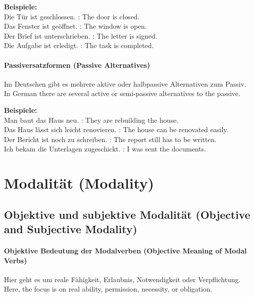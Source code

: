 \documentclass[a4paper]{article}
\begin{document}
            \textbf{Beispiele:}\\
            Die Tür ist geschlossen. : The door is closed.\\
            Das Fenster ist geöffnet. : The window is open.\\
            Der Brief ist unterschrieben. : The letter is signed.\\
            Die Aufgabe ist erledigt. : The task is completed.
        
        \paragraph{Passiversatzformen {\small (Passive Alternatives)}}
            Im Deutschen gibt es mehrere aktive oder halbpassive Alternativen zum Passiv.\\
            In German there are several active or semi-passive alternatives to the passive.
            
            \textbf{Beispiele:}\\
            Man baut das Haus neu. : They are rebuilding the house.\\
            Das Haus lässt sich leicht renovieren. : The house can be renovated easily.\\
            Der Bericht ist noch zu schreiben. : The report still has to be written.\\
            Ich bekam die Unterlagen zugeschickt. : I was sent the documents.
    
    
    \section{Modalität {\small (Modality)}}
    
    \subsection{Objektive und subjektive Modalität {\small (Objective and Subjective Modality)}}
        
        \paragraph{Objektive Bedeutung der Modalverben {\small (Objective Meaning of Modal Verbs)}}
            Hier geht es um reale Fähigkeit, Erlaubnis, Notwendigkeit oder Verpflichtung.\\
            Here, the focus is on real ability, permission, necessity, or obligation.
            
\end{document}
